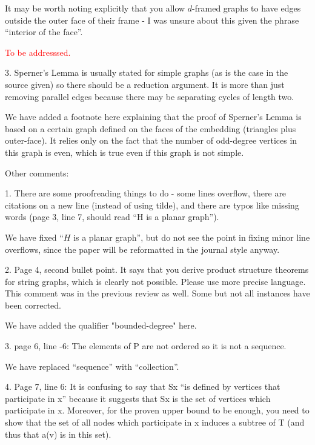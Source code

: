 \documentclass[12pt]{article}
\newcommand{\tba}{\textcolor{red}{To be addresssed.}}
\newenvironment{response}{\color{blue}}{}
\begin{document}
It may be worth noting explicitly that you allow $d$-framed graphs to
have edges outside the outer face of their frame - I was unsure about
this given the phrase “interior of the face”.

\tba

3. Sperner’s Lemma is usually stated for simple graphs (as is the case
in the source given) so there should be a reduction argument. It is
more than just removing parallel edges because there may be separating
cycles of length two.

\begin{response}
  We have added a footnote here explaining that the proof of Sperner's Lemma is based on a certain graph defined on the faces of the embedding (triangles plus outer-face).  It relies only on the fact that the number of odd-degree vertices in this graph is even, which is true even if this graph is not simple.
\end{response}

Other comments:

1. There are some proofreading things to do - some lines overflow, there
are citations on a new line (instead of using tilde), and there are typos
like missing words (page 3, line 7, should read “H is a planar graph”).

\begin{response}
	We have fixed ``$H$ is a planar graph'', but do not see the point in fixing minor line overflows, since the paper will be reformatted in the journal style anyway.
\end{response}


2. Page 4, second bullet point. It says that you derive product structure
theorems for string graphs, which is clearly not possible. Please use
more precise language. This comment was in the previous review as
well. Some but not all instances have been corrected.

\begin{response}
  We have added the qualifier "bounded-degree" here.
\end{response}

3. page 6, line -6: The elements of P are not ordered so it is not a sequence.

\begin{response}
  We have replaced ``sequence'' with ``collection''.
\end{response}

4. Page 7, line 6: It is confusing to say that Sx “is defined by vertices
that participate in x” because it suggests that Sx is the set of vertices
which participate in x. Moreover, for the proven upper bound to be
enough, you need to show that the set of all nodes which participate in
x induces a subtree of T (and thus that a(v) is in this set).
\end{document}
